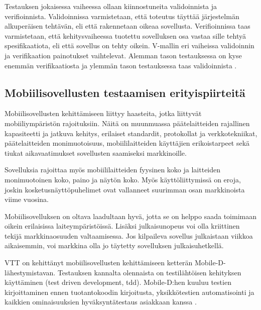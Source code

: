 Testauksen jokaisessa vaiheessa ollaan kiinnostuneita validoinnista ja verifioinnista. Validoinnissa varmistetaan, että toteutus täyttää järjestelmän alkuperäisen tehtävän, eli että rakennetaan oikeaa sovellusta. Verifioinnissa taas varmistetaan, että kehitysvaiheessa tuotettu sovelluksen osa vastaa sille tehtyä spesifikaatiota, eli että sovellus on tehty oikein. V-mallin eri vaiheissa validoinnin ja verifikaation painotukset vaihtelevat. Alemman tason testauksessa on kyse enemmän verifikaatiosta ja ylemmän tason testauksessa taas validoinnista \cite[41-42]{testing_foundations}.

\subsection{Mobiilisovellusten testaamisen erityispiirteitä}

Mobiilisovellusten kehittämiseen liittyy haasteita, jotka liittyvät mobiiliympäristön rajoituksiin. Näitä on muunmuassa päätelaitteiden rajallinen kapasiteetti ja jatkuva kehitys, erilaiset standardit, protokollat ja verkkotekniikat, päätelaitteiden monimuotoisuus, mobiililaitteiden käyttäjien erikoistarpeet sekä tiukat aikavaatimukset sovellusten saamiseksi markkinoille.

Sovelluksia rajoittaa myös mobiililaitteiden fyysinen koko ja laitteiden monimuotoinen koko, paino ja näytön koko. Myös käyttöliittymissä on eroja, joskin kosketusnäyttöpuhelimet ovat vallanneet suurimman osan markkinoista viime vuosina.

Mobiilisovelluksen on oltava laadultaan hyvä, jotta se on helppo saada toimimaan oikein erilaisissa laiteympäristöissä. Lisäksi julkaisunopeus voi olla kriittinen tekijä markkinaosuuden valtaamisessa. Jos kilpaileva sovellus julkaistaan viikkoa aikaisemmin, voi markkina olla jo täytetty sovelluksen julkaisuhetkellä.

VTT on kehittänyt mobiilisovellusten kehittämiseen ketterän Mobile-D-lähestymistavan. Testauksen kannalta olennaista on testilähtöisen kehityksen käyttäminen (test driven development, tdd). Mobile-D:hen kuuluu testien kirjoittaminen ennen tuotantokoodin kirjoitusta, yksikkötestien automatisointi ja kaikkien ominaisuuksien hyväksyntätestaus asiakkaan kanssa \cite{abrahamsson04}.

